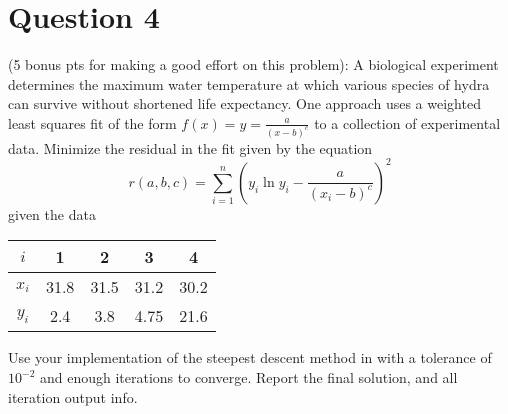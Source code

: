\section{Question 4}

\begin{question}
    (5 bonus pts for making a good effort on this problem): A biological experiment determines the maximum water temperature at which various species of hydra can survive without shortened life expectancy. One approach uses a weighted least squares fit of the form $f(x) = y = \frac{a}{(x-b)^c}$ to a collection of experimental data. Minimize the residual in the fit given by the equation $$r(a,b,c) = \sum_{i=1}^n \left( y_i\ln y_i - \frac{a}{(x_i-b)^c} \right)^2$$ given the data 
        \begin{tabular}{c|c|c|c|c}
            $i$ & 1 & 2 & 3 & 4 \\ \hline $x_i$ & 31.8 & 31.5 & 31.2 & 30.2 \\ $y_i$ & 2.4 & 3.8 & 4.75 & 21.6
        \end{tabular}
    Use your implementation of the steepest descent method in \MATLAB with a tolerance of $10^{-2}$ and enough iterations to converge. Report the final solution, and all iteration output info.
\end{question}

\begin{answer}
    
\end{answer}